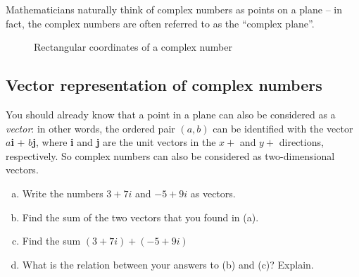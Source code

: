 Mathematicians naturally think of complex numbers as points on a plane -- in fact, the complex numbers are often referred to as the ``complex plane''.
%
\begin{figure}[hbt]  %
\begin{center}
\end{center}
\caption{Rectangular coordinates of a complex number}
\label{rectcoord}
\end{figure}

\subsection{Vector representation of complex numbers}

You should already know that a point in a plane can also be considered as a \emph{vector}: in other words, the ordered pair $(a,b)$ can be identified with the vector $a$\textbf{i} + $b$\textbf{j}, where \textbf{i} and \textbf{j} are the unit vectors in the $x+$ and $y+$ directions, respectively. So complex numbers can also be considered as two-dimensional vectors. 

\begin{exercise}{19} 
\begin{enumerate}[(a)]
\item
Write the numbers $3 + 7i$  and $-5 + 9i$ as  vectors.
\item
Find the sum of the two vectors that you found in (a).
\item
 Find the sum $(3 + 7i) + (-5 + 9i)$
\item
What is the relation between your answers to (b) and (c)? Explain.
\end{enumerate}
\end{exercise}

